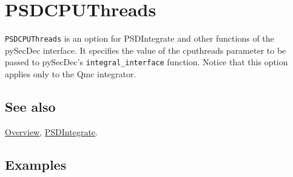 \documentclass[../FeynHelpersManual.tex]{subfiles}
\begin{document}
\hypertarget{psdcputhreads}{
\section{PSDCPUThreads}\label{psdcputhreads}}

\texttt{PSDCPUThreads} is an option for PSDIntegrate and other functions
of the pySecDec interface. It specifies the value of the cputhreads
parameter to be passed to pySecDec's \texttt{integral_interface}
function. Notice that this option applies only to the Qmc integrator.

\subsection{See also}

\hyperlink{toc}{Overview}, \hyperlink{psdintegrate}{PSDIntegrate}.

\subsection{Examples}
\end{document}

